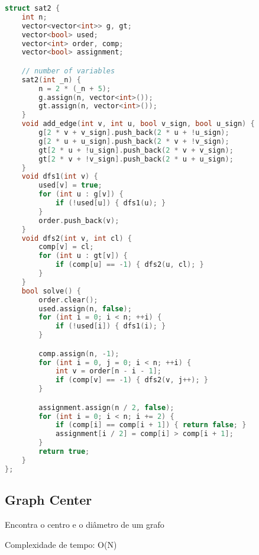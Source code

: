 \documentclass[11pt, a4paper, twoside]{article}
\begin{document}
\begin{lstlisting}[language=C++]
struct sat2 {
    int n;
    vector<vector<int>> g, gt;
    vector<bool> used;
    vector<int> order, comp;
    vector<bool> assignment;

    // number of variables
    sat2(int _n) {
        n = 2 * (_n + 5);
        g.assign(n, vector<int>());
        gt.assign(n, vector<int>());
    }
    void add_edge(int v, int u, bool v_sign, bool u_sign) {
        g[2 * v + v_sign].push_back(2 * u + !u_sign);
        g[2 * u + u_sign].push_back(2 * v + !v_sign);
        gt[2 * u + !u_sign].push_back(2 * v + v_sign);
        gt[2 * v + !v_sign].push_back(2 * u + u_sign);
    }
    void dfs1(int v) {
        used[v] = true;
        for (int u : g[v]) {
            if (!used[u]) { dfs1(u); }
        }
        order.push_back(v);
    }
    void dfs2(int v, int cl) {
        comp[v] = cl;
        for (int u : gt[v]) {
            if (comp[u] == -1) { dfs2(u, cl); }
        }
    }
    bool solve() {
        order.clear();
        used.assign(n, false);
        for (int i = 0; i < n; ++i) {
            if (!used[i]) { dfs1(i); }
        }

        comp.assign(n, -1);
        for (int i = 0, j = 0; i < n; ++i) {
            int v = order[n - i - 1];
            if (comp[v] == -1) { dfs2(v, j++); }
        }

        assignment.assign(n / 2, false);
        for (int i = 0; i < n; i += 2) {
            if (comp[i] == comp[i + 1]) { return false; }
            assignment[i / 2] = comp[i] > comp[i + 1];
        }
        return true;
    }
};
\end{lstlisting}

\subsection{Graph Center}


Encontra o centro e o diâmetro de um grafo

Complexidade de tempo: O(N)
\end{document}
